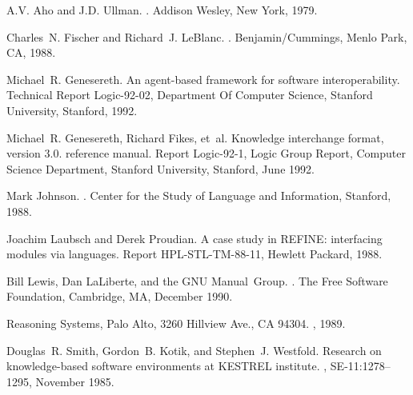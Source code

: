%
\begin{thebibliography}{99}

A.V. Aho and J.D. Ullman.
.
\newblock Addison Wesley, New York, 1979.

Charles~N. Fischer and Richard~J. LeBlanc.
.
\newblock Benjamin/Cummings, Menlo Park, CA, 1988.

Michael~R. Genesereth.
\newblock An agent-based framework for software interoperability.
\newblock Technical Report Logic-92-02, Department Of Computer Science, Stanford
  University, Stanford, 1992.

Michael~R. Genesereth, Richard Fikes, et~al.
\newblock Knowledge interchange format, version 3.0. reference manual.
\newblock Report Logic-92-1, Logic Group Report, Computer Science Department,
  Stanford University, Stanford, June 1992.

Mark Johnson.
.
\newblock Center for the Study of Language and Information, Stanford, 1988.

Joachim Laubsch and Derek Proudian.
\newblock A case study in {REFINE}: interfacing modules via languages.
\newblock Report HPL-STL-TM-88-11, Hewlett Packard, 1988.

Bill Lewis, Dan LaLiberte, and the GNU Manual~Group.
.
\newblock The Free Software Foundation, Cambridge, MA, December 1990.

Reasoning Systems, Palo Alto, 3260 Hillview Ave., CA 94304.
, 1989.

Douglas~R. Smith, Gordon~B. Kotik, and Stephen~J. Westfold.
\newblock Research on knowledge-based software environments at {KESTREL}
  institute.
, SE-11:1278--1295,
  November 1985.

\end{thebibliography}
